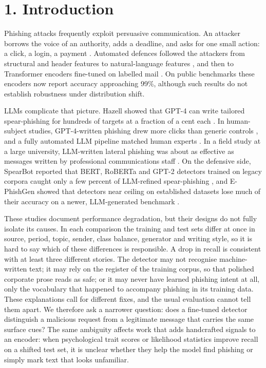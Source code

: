 \documentclass[11pt,letterpaper]{article}
\begin{document}
\section{1. Introduction}

Phishing attacks frequently exploit persuasive communication. An attacker borrows the voice of an authority, adds a deadline, and asks for one small action: a click, a login, a payment \cite{ferreira2015}. Automated defences followed the attackers from structural and header features \cite{fette2007} to natural-language features \cite{verma2012}, and then to Transformer encoders \cite{vaswani2017,devlin2019,sanh2019} fine-tuned on labelled mail \cite{lee2020,jamal2023}. On public benchmarks these encoders now report accuracy approaching 99\%, although such results do not establish robustness under distribution shift.

LLMs complicate that picture. Hazell showed that GPT-4 can write tailored spear-phishing for hundreds of targets at a fraction of a cent each \cite{hazell2023}. In human-subject studies, GPT-4-written phishing drew more clicks than generic controls \cite{heiding2024}, and a fully automated LLM pipeline matched human experts \cite{heiding2024b}. In a field study at a large university, LLM-written lateral phishing was about as effective as messages written by professional communications staff \cite{bethany2025}. On the defensive side, SpearBot reported that BERT, RoBERTa and GPT-2 detectors trained on legacy corpora caught only a few percent of LLM-refined spear-phishing \cite{qi2025}, and E-PhishGen showed that detectors near ceiling on established datasets lose much of their accuracy on a newer, LLM-generated benchmark \cite{pajola2025}.

These studies document performance degradation, but their designs do not fully isolate its causes. In each comparison the training and test sets differ at once in source, period, topic, sender, class balance, generator and writing style, so it is hard to say which of these differences is responsible. A drop in recall is consistent with at least three different stories. The detector may not recognise machine-written text; it may rely on the register of the training corpus, so that polished corporate prose reads as safe; or it may never have learned phishing intent at all, only the vocabulary that happened to accompany phishing in its training data. These explanations call for different fixes, and the usual evaluation cannot tell them apart. We therefore ask a narrower question: does a fine-tuned detector distinguish a malicious request from a legitimate message that carries the same surface cues? The same ambiguity affects work that adds handcrafted signals to an encoder: when psychological trait scores \cite{shahriar2022} or likelihood statistics improve recall on a shifted test set, it is unclear whether they help the model find phishing or simply mark text that looks unfamiliar.
\end{document}
